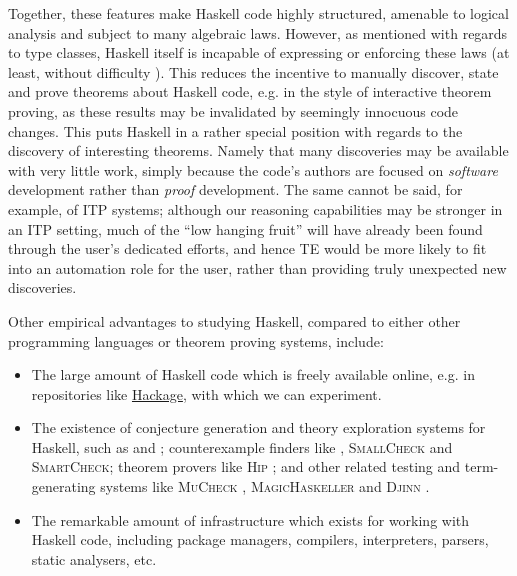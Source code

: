 Together, these features make Haskell code highly structured, amenable to logical analysis and subject to many algebraic laws. However, as mentioned with regards to type classes, Haskell itself is incapable of expressing or enforcing these laws (at least, without difficulty \citep{lindley2014hasochism}). This reduces the incentive to manually discover, state and prove theorems about Haskell code, e.g. in the style of interactive theorem proving, as these results may be invalidated by seemingly innocuous code changes. This puts Haskell in a rather special position with regards to the discovery of interesting theorems. Namely that many discoveries may be available with very little work, simply because the code's authors are focused on \emph{software} development rather than \emph{proof} development. The same cannot be said, for example, of ITP systems; although our reasoning capabilities may be stronger in an ITP setting, much of the ``low hanging fruit'' will have already been found through the user's dedicated efforts, and hence TE would be more likely to fit into an automation role for the user, rather than providing truly unexpected new discoveries.

Other empirical advantages to studying Haskell, compared to either other programming languages or theorem proving systems, include:

\begin{itemize}

\item The large amount of Haskell code which is freely available online, e.g. in repositories like \href{http://hackage.haskell.org}{Hackage}, with which we can experiment.

\item The existence of conjecture generation and theory exploration systems for Haskell, such as \qspec{} and \hspec{}; counterexample finders like \qcheck{}, \textsc{SmallCheck} and \textsc{SmartCheck}; theorem provers like \textsc{Hip} \citep{rosen2012proving}; and other related testing and term-generating systems like \textsc{MuCheck} \citep{le2014mucheck}, \textsc{MagicHaskeller} \citep{katayama2011magichaskeller} and \textsc{Djinn} \citep{augustsson2005djinn}.

\item The remarkable amount of infrastructure which exists for working with Haskell code, including package managers, compilers, interpreters, parsers, static analysers, etc.

\end{itemize}

